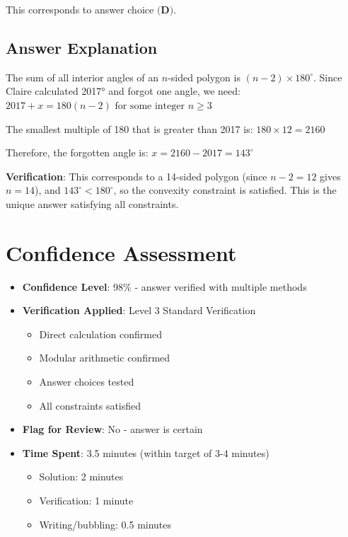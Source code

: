 \documentclass[]{article}
\begin{document}
This corresponds to answer choice $\boxed{\textbf{(D)}}$.

\subsection*{Answer Explanation}
The sum of all interior angles of an $n$-sided polygon is $(n-2) \times 180^\circ$. Since Claire calculated 2017° and forgot one angle, we need:
$2017 + x = 180(n-2) \text{ for some integer } n \geq 3$

The smallest multiple of 180 that is greater than 2017 is:
$180 \times 12 = 2160$

Therefore, the forgotten angle is:
$x = 2160 - 2017 = 143^\circ$

\textbf{Verification}: This corresponds to a 14-sided polygon (since $n - 2 = 12$ gives $n = 14$), and $143^\circ < 180^\circ$, so the convexity constraint is satisfied. This is the unique answer satisfying all constraints.

\section*{Confidence Assessment}
\begin{itemize}[leftmargin=*]
    \item \textbf{Confidence Level}: 98\% - answer verified with multiple methods
    \item \textbf{Verification Applied}: Level 3 Standard Verification
    \begin{itemize}
        \item Direct calculation confirmed
        \item Modular arithmetic confirmed
        \item Answer choices tested
        \item All constraints satisfied
    \end{itemize}
    \item \textbf{Flag for Review}: No - answer is certain
    \item \textbf{Time Spent}: 3.5 minutes (within target of 3-4 minutes)
    \begin{itemize}
        \item Solution: 2 minutes
        \item Verification: 1 minute
        \item Writing/bubbling: 0.5 minutes
    \end{itemize}
\end{itemize}
\end{document}
